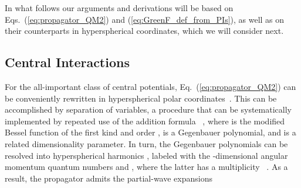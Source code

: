\documentclass[a4paper,preprint,draft,showpacs,amsmath,amsfonts,amssymb,aps,prd]{revtex4}%
\begin{document}
In what follows 
our arguments and derivations will be based on Eqs.~(\ref{eq:propagator_QM2})
and (\ref{eq:GreenF_def_from_PIs}),
as well as on their counterparts in hyperspherical coordinates, which we will 
consider next.


\subsection{Central Interactions}
\label{sec:central_interactions}


For the all-important class of central potentials,
Eq.~(\ref{eq:propagator_QM2}) can be conveniently rewritten 
in hyperspherical  polar coordinates~\cite{cam:00,cam:01,erd:53}.
This can be accomplished by separation of variables, 
a procedure that can be systematically
implemented by repeated use of the addition formula~\cite{wat:44}
\coordHE{},
where \coordHE{} 
is the modified Bessel function of the first kind and order \coordHE{},
\coordHE{} is a Gegenbauer polynomial, and
\coordHE{} is a related dimensionality parameter.
In turn, the Gegenbauer polynomials can be resolved into 
hyperspherical harmonics
\coordHE{}, 
labeled with the \coordHE{}-dimensional angular momentum quantum numbers
\coordHE{} and \coordHE{}, where the latter has a multiplicity
 \coordHE{}~\cite{erd:53}.
As a result,
the propagator admits the
partial-wave expansions
\end{document}
